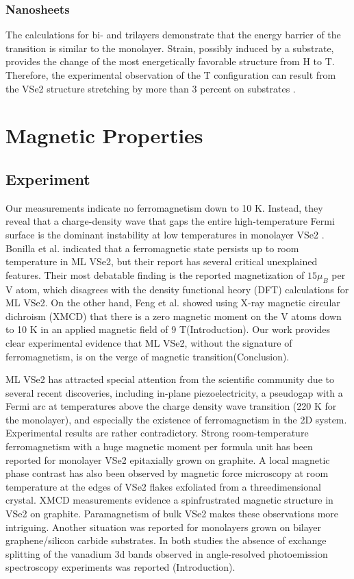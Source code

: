 \subsubsection{Nanosheets}
The calculations for bi- and trilayers demonstrate that the energy barrier of the transition is similar to the monolayer. Strain, possibly induced by a substrate, provides the change of the most energetically favorable structure from H to T. Therefore, the experimental observation of the T configuration can result from the VSe2 structure stretching by more than 3 percent on substrates \cite{C9CP03726H}.
\section{Magnetic Properties}
\subsection{Experiment}
Our measurements indicate no ferromagnetism down to 10 K. Instead, they reveal that a charge-density wave that gaps the entire high-temperature Fermi surface is the dominant instability at low temperatures in monolayer VSe2 \cite{doi:10.1021/acs.nanolett.8b01649}. Bonilla et al. indicated that a ferromagnetic state persists up to room temperature in ML VSe2, but their report has several critical unexplained features. Their most debatable finding is the reported magnetization of $15 \mu_{B}$ per V atom, which disagrees with the density functional heory (DFT) calculations for ML VSe2. On the other hand, Feng et al.\cite{doi:10.1021/acs.nanolett.8b01649} showed using X-ray magnetic circular dichroism (XMCD) that there is a zero magnetic moment on the V atoms down to 10 K in an applied magnetic field of 9 T(Introduction). Our work provides clear experimental evidence that ML VSe2, without the signature of ferromagnetism, is on the verge of magnetic transition\cite{doi:10.1021/acsnano.9b02996}(Conclusion).

ML VSe2 has attracted special attention from the scientific community due to several recent discoveries, including in-plane piezoelectricity, a pseudogap with a Fermi arc at temperatures above the charge density wave transition (220 K for the monolayer), and especially the existence of ferromagnetism in the 2D system. Experimental results are rather contradictory. Strong room-temperature ferromagnetism with a huge magnetic moment per formula unit has been reported for monolayer VSe2 epitaxially grown on graphite. A local magnetic phase contrast has also been observed by magnetic force microscopy at room temperature at the edges of VSe2 flakes exfoliated from a threedimensional crystal. XMCD measurements evidence a spinfrustrated magnetic structure in VSe2 on graphite. Paramagnetism of bulk VSe2 makes these observations more intriguing. Another situation was reported for monolayers grown on bilayer graphene/silicon carbide substrates. In both studies the absence of exchange splitting of the vanadium 3d bands observed in angle-resolved photoemission spectroscopy experiments was reported \cite{C9CP03726H}(Introduction).
